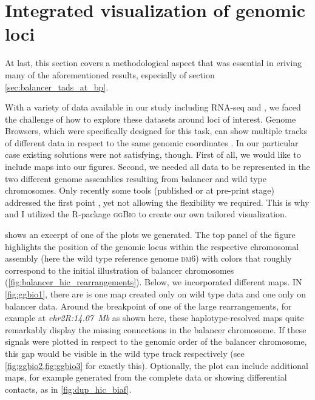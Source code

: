 \section{Integrated visualization of genomic loci}
\label{sec:balancer_visualization}

At last, this section covers a methodological aspect that was essential in
eriving many of the aforementioned results, especially of section
\cref{sec:balancer_tads_at_bp}.

With a variety of data available in our study including RNA-seq and \hic, we
faced the challenge of how to explore these datasets around loci of interest.
Genome Browsers, which were specifically designed for this task, can show
multiple tracks of different data in respect to the same genomic coordinates
\citep{Freese2016,Thorvaldsdottir2013,Gramates2017}. In our particular case
existing solutions were not satisfying, though. First of all, we would like to
include \hic maps into our figures. Second, we needed all data to be
represented in the two different genome assemblies resulting from balancer and
wild type chromosomes. Only recently some tools (published or at pre-print
stage) addressed the first point \citep{Ramirez2018,Kerpedjiev2017}, yet not
allowing the flexibility we required. This is why \alek and I utilized the
R-package \textsc{ggBio} \citep{Yin2012} to create our own tailored
visualization.


 shows an excerpt of one of the plots we generated. The top
panel of the figure highlights  the position of the genomic locus
within the respective chromosomal assembly (here the wild type reference genome
\textsc{dm6}) with colors that roughly correspond to the initial illustration of
balancer chromosomes (\cref{fig:balancer_hic_rearrangements}). Below, we
incorporated different \hic maps. IN \cref{fig:ggbio1}, there are is one \hic
map created only on  wild type data and one only on 
balancer \hic data. Around the breakpoint of one of the large rearrangements,
for example at \textit{chr2R:14.07~Mb} as shown here, these haplotype-resolved
\hic maps quite remarkably display the missing connections in the balancer
chromosome. If these signals were plotted in respect to the genomic order of
the balancer chromosome, this gap would be visible in the wild type track
respectively (see \cref{fig:ggbio2,fig:ggbio3} for exactly this).
Optionally, the plot can include additional \hic maps, for
example generated from the complete data or showing differential contacts,
as in \cref{fig:dup_hic_biaf}.

